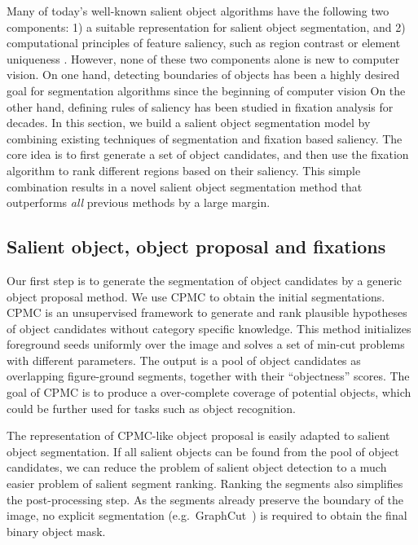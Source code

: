 Many of today's well-known salient object algorithms have the following two components: 1) a suitable representation for salient object segmentation, and 2) computational principles of feature saliency, such as region contrast \cite{cheng2011global} or element uniqueness \cite{perazzi2012saliency}.  However, none of these two components alone is new to computer vision.  On one hand, detecting boundaries of objects has been a highly desired goal for segmentation algorithms since the beginning of computer vision  On the other hand, defining rules of saliency has been studied in fixation analysis for decades.  In this section, we build a salient object segmentation model by combining existing techniques of segmentation and fixation based saliency. The core idea is to first generate a set of object candidates, and then use the fixation algorithm to rank different regions based on their saliency. This simple combination results in a novel salient object segmentation method that outperforms \emph{all} previous methods by a large margin.

\subsection{Salient object, object proposal and fixations}
Our first step is to generate the segmentation of object candidates by a generic object proposal method. We use CPMC \cite{carreira2010constrained} to obtain the initial segmentations. CPMC is an unsupervised framework to generate and rank plausible hypotheses of object candidates without category specific knowledge. This method initializes foreground seeds uniformly over the image and solves a set of min-cut problems with different parameters. The output is a pool of object candidates as overlapping figure-ground segments, together with their ``objectness'' scores. The goal of CPMC is to produce a over-complete coverage of potential objects, which could be further used for tasks such as object recognition.

The representation of CPMC-like object proposal is easily adapted to salient object segmentation.  If all salient objects can be found from the pool of object candidates, we can reduce the problem of salient object detection to a much easier problem of salient segment ranking. Ranking the segments also simplifies the post-processing step. As the segments already preserve the boundary of the image, no explicit segmentation (e.g.\ GraphCut~\cite{cheng2011global}) is required to obtain the final binary object mask.

